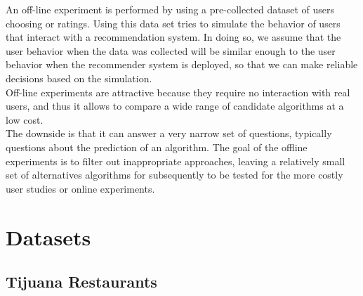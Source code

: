 An off-line experiment is performed by using a pre-collected dataset
of users choosing or ratings. Using this data set tries to simulate
the behavior of users that interact with a recommendation system. In
doing so, we assume that the user behavior when the data was collected
will be similar enough to the user behavior when the recommender
system is deployed, so that we can make reliable decisions based on
the simulation. \\ Off-line experiments are attractive because they
require no interaction with real users, and thus it allows to compare
a wide range of candidate algorithms at a low cost. \\ The downside is
that it can answer a very narrow set of questions, typically questions
about the prediction of an algorithm. The goal of the offline
experiments is to filter out inappropriate  approaches, leaving a
relatively small set of alternatives algorithms for subsequently to be
tested for the more costly user studies or online 
experiments\cite{adomavicius2011context}.

\section{Datasets} 

\subsection{Tijuana Restaurants} 

